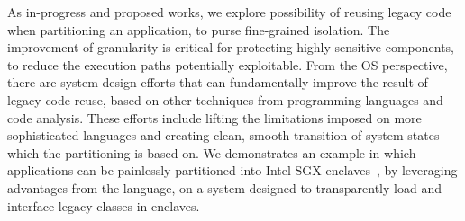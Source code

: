 
As in-progress and proposed works,
we explore possibility of reusing legacy code when partitioning an application,
to purse fine-grained isolation.
The improvement of granularity is critical for protecting highly sensitive components,
to reduce the execution paths
potentially exploitable.
From the OS perspective,
there are system design efforts that
can fundamentally improve the result of legacy code reuse,
based on other techniques from programming languages and code analysis.
These efforts include
lifting the limitations imposed on more sophisticated languages
and creating clean, smooth transition of system states
which the partitioning is based on.
We demonstrates an example
in which applications can be painlessly partitioned
into Intel SGX enclaves~\citep{intelsgx},
by leveraging advantages from the \java{} language,
on a system designed to transparently load and interface legacy \java{} classes in enclaves.








